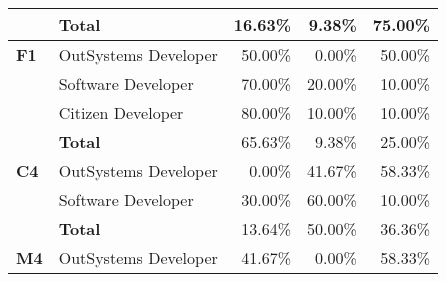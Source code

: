 \begin{table}[tb]
\begin{tabular}{@{}llrrr@{}}
                              & \textbf{Total}       & 16.63\%                                                           & 9.38\%                                                                  & 75.00\%                                                       \\ \midrule
    \textbf{F1}               & OutSystems Developer & 50.00\%                                                           & 0.00\%                                                                  & 50.00\%                                                       \\
                              & Software Developer   & 70.00\%                                                           & 20.00\%                                                                 & 10.00\%                                                       \\
                              & Citizen Developer    & 80.00\%                                                           & 10.00\%                                                                 & 10.00\%                                                       \\
                              & \textbf{Total}       & 65.63\%                                                           & 9.38\%                                                                  & 25.00\%                                                       \\ \midrule
    \textbf{C4}               & OutSystems Developer & 0.00\%                                                            & 41.67\%                                                                 & 58.33\%                                                       \\
                              & Software Developer   & 30.00\%                                                           & 60.00\%                                                                 & 10.00\%                                                       \\
                              & \textbf{Total}       & 13.64\%                                                           & 50.00\%                                                                 & 36.36\%                                                       \\ \midrule
    \textbf{M4}               & OutSystems Developer & 41.67\%                                                           & 0.00\%                                                                  & 58.33\%                                                       \\

\end{tabular}
\end{table}
